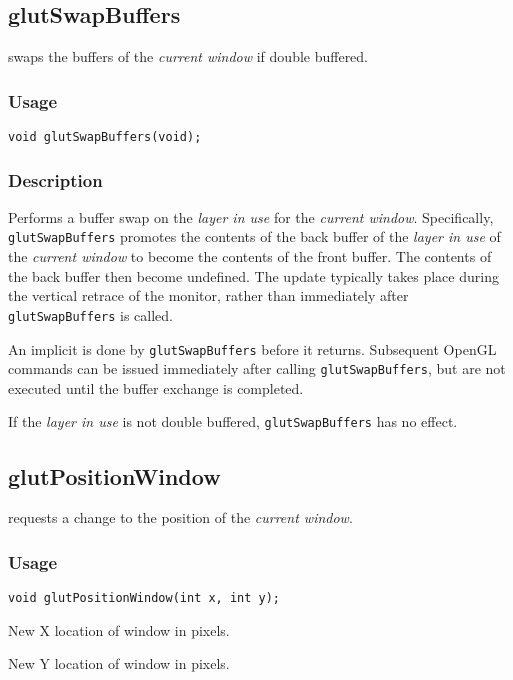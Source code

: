 \subsection{glutSwapBuffers}

 swaps the buffers of the {\em current window} if double buffered.

\subsubsection*{Usage}
\begin{verbatim}
void glutSwapBuffers(void);
\end{verbatim}

\subsubsection*{Description}

Performs a buffer swap on the {\em layer in use} for the {\em current window}.  Specifically, {\tt glutSwapBuffers}
promotes the contents of the back buffer of the {\em layer in use} of the {\em current window} to become the
contents of the front buffer.  The contents of the back buffer then
become undefined.  The update typically takes place during the vertical
retrace of the monitor, rather than immediately after {\tt glutSwapBuffers}
is called.

An implicit  is done by {\tt glutSwapBuffers} before it returns.
Subsequent OpenGL commands can be issued immediately after calling
{\tt glutSwapBuffers}, but are not executed until the buffer exchange
is completed.

If the {\em layer in use} is not double buffered, {\tt glutSwapBuffers} has no effect.

\subsection{glutPositionWindow}

 requests a change to the position of
the {\em current window}.

\subsubsection*{Usage}
\begin{verbatim}
void glutPositionWindow(int x, int y);
\end{verbatim}
\begin{description}
\itemsep 0in
\item[{\tt x}]
New X location of window in pixels.
\item[{\tt y}]
New Y location of window in pixels.
\end{description}

